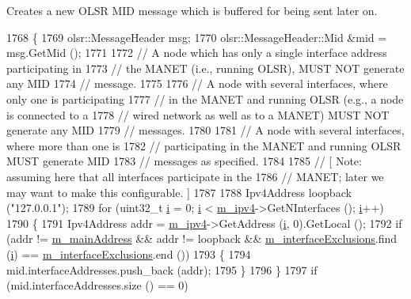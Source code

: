 Creates a new O\+L\+SR M\+ID message which is buffered for being sent later on. 


\begin{DoxyCode}
1768 \{
1769   olsr::MessageHeader msg;
1770   olsr::MessageHeader::Mid &mid = msg.GetMid ();
1771 
1772   \textcolor{comment}{// A node which has only a single interface address participating in}
1773   \textcolor{comment}{// the MANET (i.e., running OLSR), MUST NOT generate any MID}
1774   \textcolor{comment}{// message.}
1775 
1776   \textcolor{comment}{// A node with several interfaces, where only one is participating}
1777   \textcolor{comment}{// in the MANET and running OLSR (e.g., a node is connected to a}
1778   \textcolor{comment}{// wired network as well as to a MANET) MUST NOT generate any MID}
1779   \textcolor{comment}{// messages.}
1780 
1781   \textcolor{comment}{// A node with several interfaces, where more than one is}
1782   \textcolor{comment}{// participating in the MANET and running OLSR MUST generate MID}
1783   \textcolor{comment}{// messages as specified.}
1784 
1785   \textcolor{comment}{// [ Note: assuming here that all interfaces participate in the}
1786   \textcolor{comment}{// MANET; later we may want to make this configurable. ]}
1787 
1788   Ipv4Address loopback (\textcolor{stringliteral}{"127.0.0.1"});
1789   \textcolor{keywordflow}{for} (uint32\_t \hyperlink{bernuolliDistribution_8m_a6f6ccfcf58b31cb6412107d9d5281426}{i} = 0; \hyperlink{bernuolliDistribution_8m_a6f6ccfcf58b31cb6412107d9d5281426}{i} < \hyperlink{classns3_1_1olsr_1_1RoutingProtocol_afede79b25ec57e797ff900ae01bca1df}{m\_ipv4}->GetNInterfaces (); \hyperlink{bernuolliDistribution_8m_a6f6ccfcf58b31cb6412107d9d5281426}{i}++)
1790     \{
1791       Ipv4Address addr = \hyperlink{classns3_1_1olsr_1_1RoutingProtocol_afede79b25ec57e797ff900ae01bca1df}{m\_ipv4}->GetAddress (\hyperlink{bernuolliDistribution_8m_a6f6ccfcf58b31cb6412107d9d5281426}{i}, 0).GetLocal ();
1792       \textcolor{keywordflow}{if} (addr != \hyperlink{classns3_1_1olsr_1_1RoutingProtocol_a58cc50ed5d1039aab603e90e318aabfb}{m\_mainAddress} && addr != loopback && 
      \hyperlink{classns3_1_1olsr_1_1RoutingProtocol_afa7fdc171732e31fb92298d62f6340e6}{m\_interfaceExclusions}.find (\hyperlink{bernuolliDistribution_8m_a6f6ccfcf58b31cb6412107d9d5281426}{i}) == \hyperlink{classns3_1_1olsr_1_1RoutingProtocol_afa7fdc171732e31fb92298d62f6340e6}{m\_interfaceExclusions}.end ())
1793         \{
1794           mid.interfaceAddresses.push\_back (addr);
1795         \}
1796     \}
1797   \textcolor{keywordflow}{if} (mid.interfaceAddresses.size () == 0)

\end{DoxyCode}
